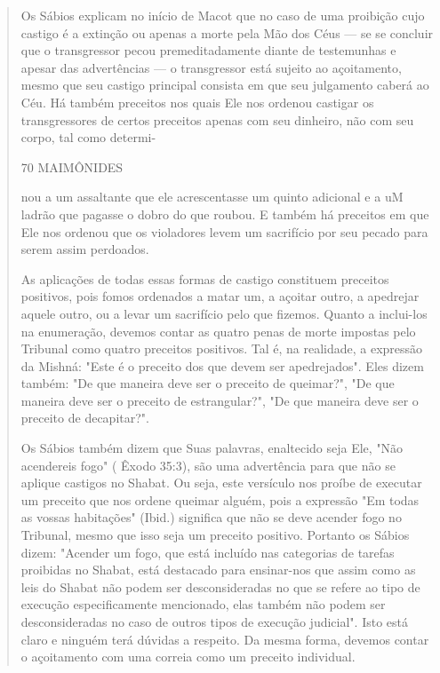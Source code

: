 \begin{quote}
Os Sábios explicam no início de Macot que no caso de uma proibi­ção cujo
castigo é a extinção ou apenas a morte pela Mão dos Céus --- se se
concluir que o transgressor pecou premeditadamente diante de testemunhas
e apesar das advertências --- o transgressor está sujeito ao
açoitamento, mesmo que seu castigo principal consista em que seu
julgamento caberá ao Céu. Há também preceitos nos quais Ele nos ordenou
castigar os transgressores de cer­tos preceitos apenas com seu dinheiro,
não com seu corpo, tal como determi-

70 MAIMÔNIDES

nou a um assaltante que ele acrescentasse um quinto adicional e a uM
ladrão que pagasse o dobro do que roubou. E também há preceitos em que
Ele nos ordenou que os violadores levem um sacrifício por seu pecado
para serem as­sim perdoados.

As aplicações de todas essas formas de castigo constituem preceitos
positivos, pois fomos ordenados a matar um, a açoitar outro, a apedrejar
aque­le outro, ou a levar um sacrifício pelo que fizemos. Quanto a
inclui-los na enu­meração, devemos contar as quatro penas de morte
impostas pelo Tribunal co­mo quatro preceitos positivos. Tal é, na
realidade, a expressão da Mishná: "Es­te é o preceito dos que devem ser
apedrejados". Eles dizem também: "De que maneira deve ser o preceito de
queimar?", "De que maneira deve ser o precei­to de estrangular?", "De
que maneira deve ser o preceito de decapitar?".

Os Sábios também dizem que Suas palavras, enaltecido seja Ele, "Não
acendereis fogo" ( Êxodo 35:3), são uma advertência para que não se
aplique castigos no Shabat. Ou seja, este versículo nos proíbe de
executar um preceito que nos ordene queimar alguém, pois a expressão "Em
todas as vossas habita­ções" (Ibid.) significa que não se deve acender
fogo no Tribunal, mesmo que isso seja um preceito positivo. Portanto os
Sábios dizem: "Acender um fogo, que está incluído nas categorias de
tarefas proibidas no Shabat, está destacado para ensinar-nos que assim
como as leis do Shabat não podem ser desconside­radas no que se refere
ao tipo de execução especificamente mencionado, elas também não podem
ser desconsideradas no caso de outros tipos de execução judicial". Isto
está claro e ninguém terá dúvidas a respeito. Da mesma forma, devemos
contar o açoitamento com uma correia como um preceito individual.


\end{quote}
